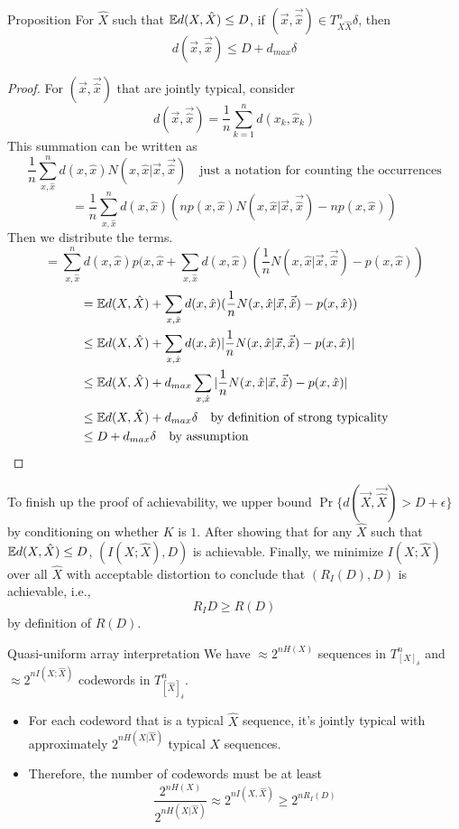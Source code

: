 \documentclass[../main.tex]{subfiles}
\begin{document}
\begin{bbox}{Proposition}
    For $\hat X$ such that $\mathbb{E} d(X,\hat X)\leq D$, if $(\vec x, \vec{\hat x})\in T^n_{X\hat X} \delta$, then \[
    d(\vec x,\vec{\hat x})\leq D+d_{max}\delta
    \]
    \begin{proof}
        For $(\vec x, \vec{\hat x})$ that are jointly typical, consider \[
        d(\vec x, \vec{\hat x})=\frac{1}{n}\sum_{k=1}^n d(x_k,\hat x_k)
        \]
        This summation can be written as \[
        \frac{1}{n}\sum_{x,\hat x}^n d(x,\hat x) N(x,\hat x|\vec x,\vec{\hat x}) \quad \text{just a notation for counting the occurrences}
        \]
        \[
        =\frac{1}{n}\sum_{x,\hat x}^n d(x,\hat x)(np(x,\hat x)N(x,\hat x|\vec x,\vec{\hat x})-np(x,\hat x))
        \]
        Then we distribute the terms.
        \[
        = \sum_{x,\hat x}^n d(x,\hat x)p(x,\hat x + \sum_{x,\hat x}d(x,\hat x)(\frac{1}{n}N(x,\hat x|\vec x,\vec{\hat x})-p(x,\hat x))
        \]
        \begin{align*}
            &=\mathbb{E} d(X,\hat X)+\sum_{x,\hat x}d(x,\hat x)(\frac{1}{n}N(x,\hat x|\vec x, \vec{\hat x}) - p(x,\hat x))\\
            &\leq \mathbb{E} d(X,\hat X)+\sum_{x,\hat x}d(x,\hat x)|\frac{1}{n}N(x,\hat x|\vec x, \vec{\hat x}) - p(x,\hat x)|\\
            &\leq \mathbb{E} d(X,\hat X)+d_{max}\sum_{x,\hat x}|\frac{1}{n}N(x,\hat x|\vec x, \vec{\hat x}) - p(x,\hat x)|\\
            &\leq \mathbb{E} d(X,\hat X) + d_{max}\delta \quad \text{by definition of strong typicality}\\
            &\leq D+d_{max}\delta \quad \text{by assumption}
        \end{align*}
    \end{proof}
\end{bbox}
To finish up the proof of achievability, we upper bound $\Pr\{d(\vec X,\vec{\hat X})>D+\epsilon\}$ by conditioning on whether $K$ is $1$. 
\newline
After showing that for any $\hat X$ such that $\mathbb{E} d(X,\hat X)\leq D$, $(I(X;\hat X),D)$ is achievable. Finally, we minimize $I(X;\hat X)$ over all $\hat X$ with acceptable distortion to conclude that $(R_I(D),D)$ is achievable, i.e., \[
R_I{D}\geq R(D)
\] by definition of $R(D)$.
\begin{pbox}{Quasi-uniform array interpretation}
    We have $\approx 2^{nH(X)}$ sequences in $T^n_{[X]_\delta}$ and $\approx 2^{nI(X;\hat X)}$ codewords in $T^n_{[\hat X]_\delta}$. 
    \newline
    \begin{itemize}
        \item For each codeword that is a typical $\hat X$ sequence, it's jointly typical with approximately $2^{nH(X|\hat X)}$ typical $X$ sequences.
        \item Therefore, the number of codewords must be at least\[
        \frac{2^{nH(X)}}{2^{nH(X|\hat X)}}\approx 2^{nI(X,\hat X)}\geq 2^{nR_I(D)}
        \]
    \end{itemize}
\end{pbox}
\end{document}
